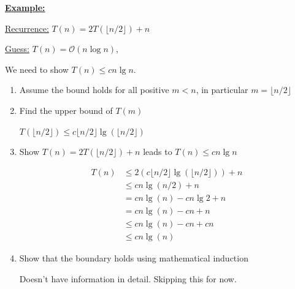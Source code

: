\documentclass[12pt]{article}
\begin{document}
\begin{enumerate}[1.]
\begin{itemize}
\begin{itemize}
            \bigskip

            \underline{\textbf{Example:}}

            \bigskip

            \underline{Recurrence:} $T(n) = 2T(\lfloor n/2 \rfloor) + n$

            \bigskip

            \underline{Guess:} $T(n) = \mathcal{O}(n\log n)$,

            \bigskip

            We need to show $T(n) \leq cn \lg n$.

            \bigskip

            \begin{enumerate}[1.]
                \item Assume the bound holds for all positive $m < n$, in particular $m = \lfloor n/2 \rfloor$
                \item Find the upper bound of $T(m)$

                \bigskip

                $T(\lfloor n/2 \rfloor) \leq c \lfloor n/2 \rfloor \lg (\lfloor n/2 \rfloor)$

                \bigskip

                \item Show $T(n) = 2T(\lfloor n/2 \rfloor) + n$ leads to $T(n) \leq cn \lg n$

                \bigskip

                \begin{align}
                    T(n) &\leq 2(c \lfloor n/2 \rfloor \lg (\lfloor n/2 \rfloor)) + n\\
                    &\leq cn \lg (n/2) + n\\
                    &= cn \lg (n) - cn \lg 2 + n\\
                    &= cn \lg (n) - cn + n\\
                    &\leq cn \lg (n) - cn + cn\\
                    &\leq cn \lg (n)
                \end{align}

                \item Show that the boundary holds using mathematical induction

                \bigskip

                \color{red}Doesn't have information in detail. Skipping this for now.\color{black}
            \end{enumerate}


\end{itemize}
\end{itemize}
\end{enumerate}
\end{document}
